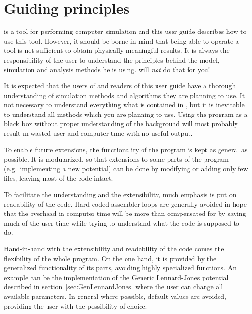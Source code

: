 \section{Guiding principles}
\label{sec:ideas}

\es is a tool for performing computer simulation and this user guide
describes how to use this tool. However, it should be borne in mind
that being able to operate a tool is not sufficient to obtain 
physically meaningful results. It is always the responsibility of the user
to understand the principles behind the model, simulation
and analysis methods he is using. \es will \emph{not} do that for you!

It is expected that the users of \es and readers of this user guide 
have a thorough understanding of simulation methods and algorithms
they are planning to use. It not necessary to understand everything
what is contained in \es, but it is inevitable to understand
all methods which you are planning to use. Using the program as a black box
without proper understanding of the background will most probably result
in wasted user and computer time with no useful output.

To enable future extensions, the functionality of the program is kept
as general as possible. It is modularized, so that extensions to some
parts of the program (e.g.\ implementing a new potential) can be done
by modifying or adding only few files, leaving most of the 
code intact.

To facilitate the understanding and the extensibility, much emphasis is put on readability of the code. Hard-coded assembler loops are 
generally avoided in hope that the overhead in computer time
will be more than compensated for by saving much of the user time 
while trying to understand what the code is supposed to do.

Hand-in-hand with the extensibility and readability of the code comes 
the flexibility of the whole program. On the one hand, it is provided
by the generalized functionality of its parts, avoiding highly specialized
functions. An example can be the implementation of the Generic Lennard-Jones
potential described in section~\ref{sec:GenLennardJones} where the user
can change all available parameters. In general where possible, default
values are avoided, providing the user with the possibility of choice.

